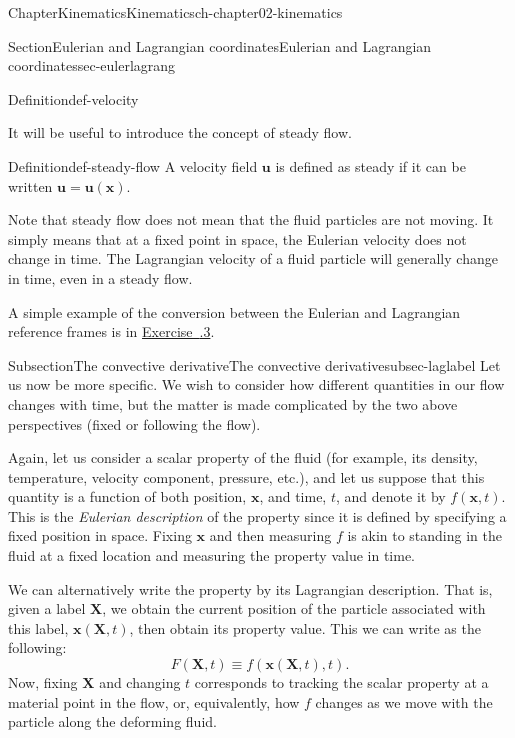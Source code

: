 \documentclass[oneside,10pt,]{book}
\newcommand{\xreffont}{\relax}
\numberwithin{equation}{section}
\newcommand{\bx}{\boldsymbol{x}}
\newcommand{\bX}{\boldsymbol{X}}
\newcommand{\bu}{\boldsymbol{u}}
\begin{document}
\begin{chapterptx}{Chapter}{Kinematics}{}{Kinematics}{}{}{ch-chapter02-kinematics}
\begin{sectionptx}{Section}{Eulerian and Lagrangian coordinates}{}{Eulerian and Lagrangian coordinates}{}{}{sec-eulerlagrang}
\begin{introduction}{}
\begin{definition}{Definition}{}{def-velocity}
\end{definition}
It will be useful to introduce the concept of steady flow.%
\begin{definition}{Definition}{}{def-steady-flow}%
A velocity field \(\bu\) is defined as steady if it can be written \(\bu=\bu(\bx)\).%
\end{definition}
Note that steady flow does not mean that the fluid particles are not moving. It simply means that at a fixed point in space, the Eulerian velocity does not change in time. The Lagrangian velocity of a fluid particle will generally change in time, even in a steady flow.%
\par
A simple example of the conversion between the Eulerian and Lagrangian reference frames is in \hyperlink{ex-eulerian-lagrangian}{Exercise~{\xreffont 2.3.3}}.%
\end{introduction}%
%
%
\typeout{************************************************}
\typeout{************************************************}
%
\begin{subsectionptx}{Subsection}{The convective derivative}{}{The convective derivative}{}{}{subsec-laglabel}
Let us now be more specific. We wish to consider how different quantities in our flow changes with time, but the matter is made complicated by the two above perspectives (fixed or following the flow).%
\par
Again, let us consider a scalar property of the fluid (for example, its density, temperature, velocity component, pressure, etc.), and let us suppose that this quantity is a function of both position, \(\bx\), and time, \(t\), and denote it by \(f(\bx, t)\). This is the \emph{Eulerian description} of the property since it is defined by specifying a fixed position in space. Fixing \(\bx\) and then measuring \(f\) is akin to standing in the fluid at a fixed location and measuring the property value in time.%
\par
We can alternatively write the property by its Lagrangian description. That is, given a label \(\bX\), we obtain the current position of the particle associated with this label, \(\bx(\bX,
t)\), then obtain its property value. This we can write as the following:%
\begin{equation*}
F(\bX, t) \equiv f(\bx(\bX, t), t).
\end{equation*}
Now, fixing \(\bX\) and changing \(t\) corresponds to tracking the scalar property at a material point in the flow, or, equivalently, how \(f\) changes as we move with the particle along the deforming fluid.%

\end{subsectionptx}
\end{sectionptx}
\end{chapterptx}
\end{document}
